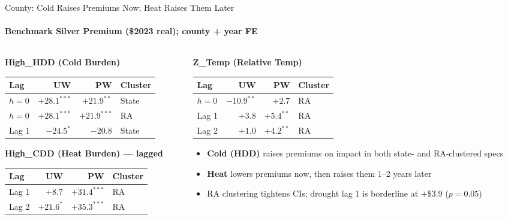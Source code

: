 \documentclass[aspectratio=169,11pt]{beamer}
\newcommand{\emphcolor}[1]{{\color{WarmOrange}\textbf{#1}}}
\newcommand{\tealtext}[1]{{\color{Teal}#1}}
\begin{document}
\begin{frame}{County: Cold Raises Premiums Now; Heat Raises Them Later}
  \framesubtitle{Benchmark Silver Premium (\$2023 real); county + year FE}
  \scriptsize
  \begin{columns}[T]
    \begin{column}{0.47\textwidth}
      \tealtext{\textbf{High\_HDD (Cold Burden)}}\\[0.25em]
      \begin{tabular}{lrrl}
        \toprule
        Lag & UW & PW & Cluster \\
        \midrule
        $h{=}0$ & \emphcolor{$+28.1^{***}$} & \emphcolor{$+21.9^{**}$}  & State \\
        $h{=}0$ & \emphcolor{$+28.1^{***}$} & \emphcolor{$+21.9^{***}$} & RA    \\
        Lag 1   & $-24.5^{*}$  & $-20.8$  & State \\
        \bottomrule
      \end{tabular}
      \vspace{0.4em}

      \tealtext{\textbf{High\_CDD (Heat Burden) — lagged}}\\[0.25em]
      \begin{tabular}{lrrl}
        \toprule
        Lag & UW & PW & Cluster \\
        \midrule
        Lag 1 & $+8.7$  & \emphcolor{$+31.4^{***}$} & RA \\
        Lag 2 & \emphcolor{$+21.6^{*}$} & \emphcolor{$+35.3^{***}$} & RA \\
        \bottomrule
      \end{tabular}
    \end{column}
    \begin{column}{0.47\textwidth}
      \tealtext{\textbf{Z\_Temp (Relative Temp)}}\\[0.25em]
      \begin{tabular}{lrrl}
        \toprule
        Lag & UW & PW & Cluster \\
        \midrule
        $h{=}0$ & \emphcolor{$-10.9^{**}$} & $+2.7$  & RA \\
        Lag 1   & $+3.8$  & \emphcolor{$+5.4^{**}$}  & RA \\
        Lag 2   & $+1.0$  & \emphcolor{$+4.2^{**}$}  & RA \\
        \bottomrule
      \end{tabular}
      \vspace{0.25em}
      \begin{itemize}\itemsep0.14em
        \item \emphcolor{Cold (HDD)} raises premiums on impact in both state- and RA-clustered specs
        \item \emphcolor{Heat} lowers premiums now, then raises them 1--2 years later
        \item RA clustering tightens CIs; drought lag 1 is borderline at $+\$3.9$ ($p{=}0.05$)
      \end{itemize}
    \end{column}
  \end{columns}
\end{frame}
\end{document}
